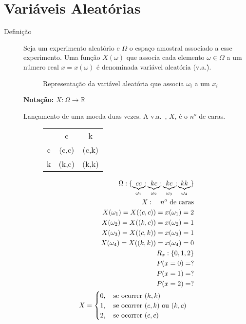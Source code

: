   \section{Variáveis Aleatórias}
   \begin{description}
     \item [Definição] Seja um experimento aleatório e $\Omega$ o espaço amostral associado 
       a esse experimento. Uma função $X(\omega)$ que associa cada elemento $\omega \in
       \Omega$ a um número real $x=x(\omega)$ é denominada variável aleatória (v.a.\.). 
       \begin{figure}[H]
         \centering
         
         \caption{Representação da variável aleatória que associa $\omega_i$ a um $x_i$}
         \label{fig:23}
       \end{figure}

       \textbf{Notação:} $X:\Omega \to \mathbb{R}$

       \begin{example}Lançamento de uma moeda duas vezes. A v.a.\ , $X$, é o $n^o$ de caras. 
         \begin{figure} [H]
           \centering
           \begin{tabular}{c c c}
             \toprule
             &c&k\\ \cmidrule{2-3}
             c&(c,c)&(c,k)\\ \cmidrule{2-3}
             k&(k,c)&(k,k)\\    \bottomrule
           \end{tabular}
           \label{tab:3}
         \end{figure}

         \begin{align*}
           \Omega : \{ \underbrace{cc}_{\omega_1};\underbrace{kc}_{\omega_2};\underbrace{kc}_{\omega_3};\underbrace{kk}_{\omega_4} \}\\
           X: \text{\quad $n^o$ de caras}\\
           X(\omega_1)= X((c,c))= x(\omega_1)=2\\
           X(\omega_2)= X((k,c))= x(\omega_2)=1\\
           X(\omega_3)= X((c,k))= x(\omega_3)=1\\
           X(\omega_4)= X((k,k))= x(\omega_4)=0\\
           R_x: \{0,1,2 \}\\
           P(x=0)=?\\
           P(x=1)=? \\
           P(x=2)=? \\
           X=
           \begin{cases}
             0, \text{\quad se ocorrer $(k,k)$} \\
             1, \text{\quad se ocorrer $(c,k)$ ou $(k,c)$} \\
             2,\text{\quad se ocorrer $(c,c)$}
           \end{cases}
         \end{align*}


\end{example}
\end{description}
